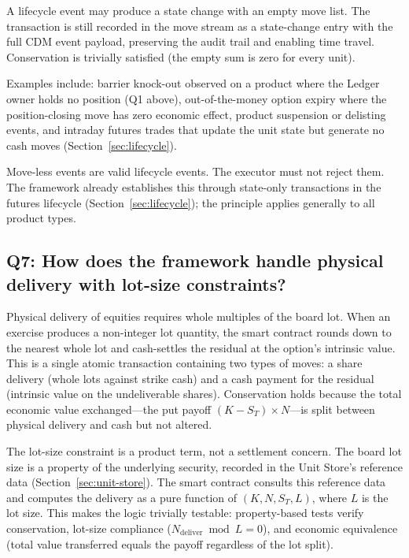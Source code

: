 \documentclass[11pt,a4paper]{article}
\begin{document}
A lifecycle event may produce a state change with an empty move list. The transaction is still recorded in the move stream as a state-change entry with the full CDM event payload, preserving the audit trail and enabling time travel. Conservation is trivially satisfied (the empty sum is zero for every unit).

Examples include: barrier knock-out observed on a product where the Ledger owner holds no position (Q1 above), out-of-the-money option expiry where the position-closing move has zero economic effect, product suspension or delisting events, and intraday futures trades that update the unit state but generate no cash moves (Section~\ref{sec:lifecycle}).

Move-less events are valid lifecycle events. The executor must not reject them. The framework already establishes this through state-only transactions in the futures lifecycle (Section~\ref{sec:lifecycle}); the principle applies generally to all product types.

\subsection*{Q7: How does the framework handle physical delivery with lot-size constraints?}

Physical delivery of equities requires whole multiples of the board lot. When an exercise produces a non-integer lot quantity, the smart contract rounds down to the nearest whole lot and cash-settles the residual at the option's intrinsic value. This is a single atomic transaction containing two types of moves: a share delivery (whole lots against strike cash) and a cash payment for the residual (intrinsic value on the undeliverable shares). Conservation holds because the total economic value exchanged---the put payoff $(K - S_T) \times N$---is split between physical delivery and cash but not altered.

The lot-size constraint is a product term, not a settlement concern. The board lot size is a property of the underlying security, recorded in the Unit Store's reference data (Section~\ref{sec:unit-store}). The smart contract consults this reference data and computes the delivery as a pure function of $(K, N, S_T, L)$, where $L$ is the lot size. This makes the logic trivially testable: property-based tests verify conservation, lot-size compliance ($N_{\text{deliver}} \bmod L = 0$), and economic equivalence (total value transferred equals the payoff regardless of the lot split).
\end{document}
